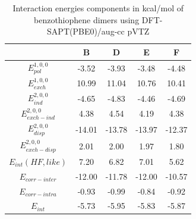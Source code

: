 		\begin{spacing}{1.3}
			\begin{table}[H]
				\caption{Interaction energies components in kcal/mol of benzothiophene dimers using DFT-SAPT(PBE0)/aug-cc pVTZ} \label{tableP1-4}
				\begin{center}
					\begin{tabular}{c c c c c}
						\toprule
						&\textbf{B} &\textbf{D} &\textbf{E} &\textbf{F} \\
						\midrule
						\multicolumn{1}{p{5cm}}{\centering \textbf{$E^{1,0,0}_{pol}$}}       & -3.52     & -3.93     & -3.48     & -4.48     \\
						\multicolumn{1}{p{5cm}}{\centering \textbf{$E^{1,0,0}_{exch}$}}      & 10.99     & 11.04     & 10.76     & 10.41     \\
						\multicolumn{1}{p{5cm}}{\centering \textbf{$E^{2,0,0}_{ind}$}}       & -4.65     & -4.83     &-4.46      & -4.69     \\
						\multicolumn{1}{p{5cm}}{\centering \textbf{$E^{2,0,0}_{exch-ind}$}}  & 4.38      & 4.54      & 4.19      & 4.38      \\
						\multicolumn{1}{p{5cm}}{\centering \textbf{$E^{2,0,0}_{disp}$}}      & -14.01    & -13.78    & -13.97    & -12.37    \\
						\multicolumn{1}{p{5cm}}{\centering \textbf{$E^{2,0,0}_{exch-disp}$}} & 2.01      & 2.00      & 1.97      & 1.80      \\
						\multicolumn{1}{p{5cm}}{\centering \textbf{$E_{int} (\scriptstyle HF, like)$}}    & 7.20      & 6.82      & 7.01      & 5.62      \\
						\multicolumn{1}{p{5cm}}{\centering \textbf{$E_{corr-inter}$}}        & -12.00    & -11.78    & -12.00    & -10.57    \\
						\multicolumn{1}{p{5cm}}{\centering \textbf{$E_{corr-intra}$}}        & -0.93     & -0.99     & -0.84     & -0.92     \\
						\multicolumn{1}{p{5cm}}{\centering \textbf{$E_{int}$}}               & -5.73     & -5.95     & -5.83     & -5.87     \\
						\bottomrule
					\end{tabular}
				\end{center}
			\end{table}
		\end{spacing}
		
